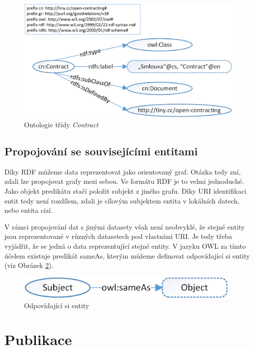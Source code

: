 \begin{figure}[h]
\centerline{\includegraphics[width=\textwidth]{img/rdf_ontologyClass.eps}}
\caption{Ontologie třídy \textit{Contract}}
\label{obr:rdf_ontologyClass}
\end{figure}

\subsection{Propojování se souvisejícími entitami}

Díky RDF můžeme data reprezentovat jako orientovaný graf. Otázka tedy zní, zdali lze propojovat grafy mezi sebou. Ve formátu RDF je to velmi jednoduché. Jako objekt predikátu stačí položit subjekt z jiného grafu. Díky URI identifikaci entit tedy není rozdílem, zdali je cílovým subjektem entita v lokálních datech, nebo entita cizí.  

V rámci propojování dat s jinými datasety však není neobvyklé, že stejné entity jsou reprezentované v různých datasetech pod vlastními URI. Je tedy třeba vyjádřit, že se jedná o data reprezentující stejné entity. V jazyku OWL za tímto účelem existuje predikát sameAs, kterým můžeme definovat odpovídající si entity (viz Obrázek \ref{obr:rdf_ontologyLinks}).

\begin{figure}[h]
\centerline{\includegraphics[width=110mm]{img/rdf_ontologyLinks.eps}}
\caption{Odpovídající si entity}
\label{obr:rdf_ontologyLinks}
\end{figure}

\newpage

\section{Publikace}

